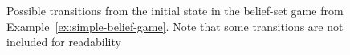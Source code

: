 

\begin{figure}


\vspace{-.3cm}
\caption{Possible transitions from the initial state in the belief-set game from Example~\ref{ex:simple-belief-game}. Note that some transitions are not included for readability}
\label{fig:simple-belief-game}
\vspace{-.5cm}
\end{figure}

